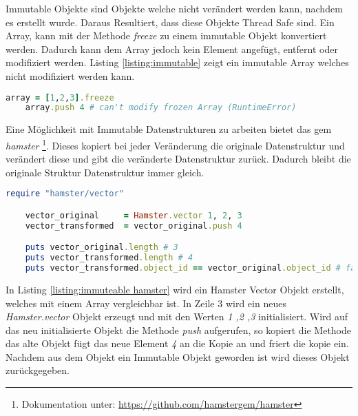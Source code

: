Immutable Objekte sind Objekte welche nicht verändert werden kann, nachdem es erstellt wurde. Daraus Resultiert, dass diese Objekte Thread Safe sind. Ein Array, kann mit der Methode \emph{freeze} zu einem immutable Objekt konvertiert werden. Dadurch kann dem Array jedoch kein Element angefügt, entfernt oder modifiziert werden. Listing \ref{listing:immutable} zeigt ein immutable Array welches nicht modifiziert werden kann. 

\begin{lstlisting}[language=Ruby,label={listing:immutable}]
	array = [1,2,3].freeze
	array.push 4 # can't modify frozen Array (RuntimeError)
\end{lstlisting}

Eine Möglichkeit mit Immutable Datenstrukturen zu arbeiten bietet das gem \emph{hamster} \footnote{Dokumentation unter: \url{https://github.com/hamstergem/hamster}}. Dieses kopiert bei jeder Veränderung die originale Datenstruktur und verändert diese und gibt die veränderte Datenstruktur zurück. Dadurch bleibt die originale Struktur Datenstruktur immer gleich. 

\begin{lstlisting}[language=Ruby,label={listing:immuteable hamster}]
	require "hamster/vector"

	vector_original     = Hamster.vector 1, 2, 3
	vector_transformed  = vector_original.push 4

	puts vector_original.length # 3
	puts vector_transformed.length # 4
	puts vector_transformed.object_id == vector_original.object_id # false
\end{lstlisting}

In Listing \ref{listing:immuteable hamster} wird ein Hamster Vector Objekt erstellt, welches mit einem Array vergleichbar ist. In Zeile 3 wird ein neues \emph{Hamster.vector} Objekt erzeugt und mit den Werten \emph{1 ,2 ,3} initialisiert. Wird auf das neu initialisierte Objekt die Methode \emph{push} aufgerufen, so kopiert die Methode das alte Objekt fügt das neue Element \emph{4} an die Kopie an und friert die kopie ein. Nachdem aus dem Objekt ein Immutable Objekt geworden ist wird dieses Objekt zurückgegeben.


